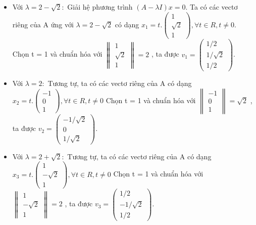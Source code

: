 \documentclass{article}
\begin{document}
\begin{itemize}
    \item Với \( \lambda = 2-\sqrt{2}: \)
          \newline Giải hệ phương trình \( (A - \lambda I)x = 0 \).
          Ta có các vectơ riêng của A ứng với \( \lambda = 2-\sqrt2\) có dạng
          \( x_1 = t.\begin{pmatrix} 1 \\ \sqrt{2} \\ 1 \end{pmatrix}
          ,\forall t \in R, t \neq 0 \).
          \newline Chọn t = 1 và chuẩn hóa với \( \begin{Vmatrix} 1 \\ \sqrt2 \\ 1 \end{Vmatrix}
          = 2 \) , ta được
          \(v_1 = \begin{pmatrix} 1/2 \\ 1/ \sqrt2 \\ 1/2 \end{pmatrix}\).
    \item Với \( \lambda = 2: \)
          \newline Tương tự, ta có các vectơ riêng của A có dạng
          \( x_2 = t.\begin{pmatrix}
              -1 \\ 0 \\ 1
          \end{pmatrix} ,\forall t \in R, t \neq 0 \)
          \newline Chọn t = 1 và chuẩn hóa với \( \begin{Vmatrix} -1 \\ 0 \\ 1 \end{Vmatrix}
          = \sqrt2 \) , ta được
          \(v_2 = \begin{pmatrix} -1/ \sqrt2 \\ 0 \\ 1/ \sqrt2 \end{pmatrix}\).
    \item Với \( \lambda = 2+\sqrt2: \)
          \newline Tương tự, ta có các vectơ riêng của A có dạng
          \( x_3 = t.\begin{pmatrix}
              1 \\ - \sqrt2 \\ 1
          \end{pmatrix} ,\forall t \in R, t \neq 0 \)
          \newline Chọn t = 1 và chuẩn hóa với \( \begin{Vmatrix} 1 \\ - \sqrt2 \\ 1 \end{Vmatrix}
          = 2 \) , ta được
          \(v_3 = \begin{pmatrix} 1/2 \\ -1/ \sqrt2 \\ 1/2 \end{pmatrix}\).
\end{itemize}
\end{document}
